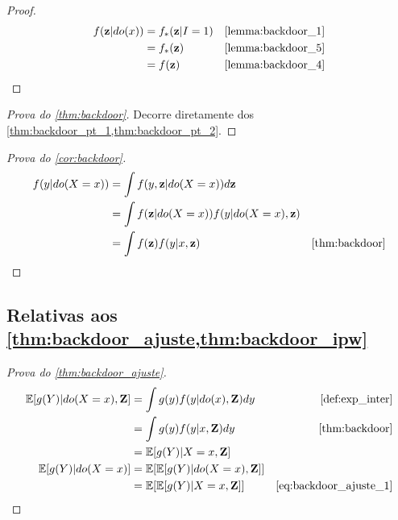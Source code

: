 \begin{proof}
 \begin{align*}
  f(\z|do(x))
  &= f_*(\z|I=1)
  & \text{\cref{lemma:backdoor_1}} \\
  &= f_*(\z)
  & \text{\cref{lemma:backdoor_5}} \\
  &= f(\z)
  & \text{\cref{lemma:backdoor_4}}
 \end{align*}
\end{proof}

\begin{proof}[Prova do \cref{thm:backdoor}]
 Decorre diretamente dos
 \cref{thm:backdoor_pt_1,thm:backdoor_pt_2}.
\end{proof}

\begin{proof}[Prova do \cref{cor:backdoor}]
 \begin{align*}
  f(y|do(X=x))
  &= \int f(y,\z|do(X=x))d\z \\
  &= \int f(\z|do(X=x))f(y|do(X=x),\z) \\
  &= \int f(\z)f(y|x,\z)
  & \text{\cref{thm:backdoor}}
 \end{align*}
\end{proof}

\subsection{Relativas aos \cref{thm:backdoor_ajuste,thm:backdoor_ipw}}

\begin{proof}[Prova do \cref{thm:backdoor_ajuste}]
 \begin{align}
  \label{eq:backdoor_ajuste_1}
  \E[g(Y)|do(X=x),\Z]
  &= \int g(y) f(y|do(x),\Z) dy 
  & \text{\cref{def:exp_inter}} \nonumber \\
  &= \int g(y) f(y|x, \Z)dy 
  & \text{\cref{thm:backdoor}} \nonumber \\
  &= \E[g(Y)|X=x,\Z] \\
  \E[g(Y)|do(X=x)]
  &= \E[\E[g(Y)|do(X=x),\Z]] \nonumber \\
  &= \E[\E[g(Y)|X=x,\Z]]
  & \text{\cref{eq:backdoor_ajuste_1}} \nonumber
 \end{align}
\end{proof}

